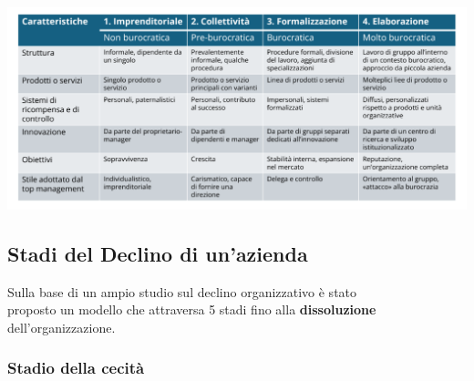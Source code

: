 \documentclass[14pt]{extarticle}
\begin{document}
\begin{center}
    \includegraphics[scale=0.50]{images/stati_sviluppo.png}
\end{center}

\subsection{Stadi del Declino di un'azienda}

Sulla base di un ampio studio sul declino organizzativo è stato \\
proposto un modello che attraversa 5 stadi fino alla \textbf{dissoluzione}
dell'organizzazione.

\subsubsection{Stadio della cecità}
\end{document}
